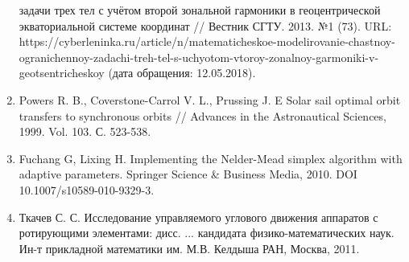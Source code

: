 \begin{enumerate}
задачи трех тел с учётом второй зональной гармоники в геоцентрической экваториальной
системе координат // Вестник СГТУ. 2013. №1 (73). URL:
https://cyberleninka.ru/article/n/matematicheskoe-modelirovanie-chastnoy-ogranichennoy-zadachi-treh-tel-s-uchyotom-vtoroy-zonalnoy-garmoniki-v-geotsentricheskoy
(дата обращения: 12.05.2018).
  \item Powers R. B., Coverstone-Carrol V. L., Prussing J. E Solar sail optimal
  orbit transfers to synchronous orbits // Advances in the Astronautical Sciences, 1999. Vol. 103. С. 523-538.
  \item Fuchang G, Lixing H. Implementing the Nelder-Mead simplex algorithm
with adaptive parameters. Springer Science \& Business Media, 2010. DOI 10.1007/s10589-010-9329-3.
    \item Ткачев С. С. Исследование управляемого углового движения аппаратов с
ротирующими элементами: дисс. ... кандидата физико-математических наук. Ин-т прикладной математики им. М.В. Келдыша РАН,
Москва, 2011.
\end{enumerate}
